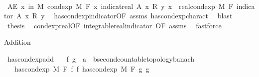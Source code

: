 \begin{isabellebody}
%
\isadelimproof
%
\endisadelimproof
%
\isatagproof
{}\isamarkupfalse%
\ {\isacharminus}{\kern0pt}\isanewline
\ \ \isamarkupfalse%
\ {\isachardoublequoteopen}AE\ x\ in\ M{\isachardot}{\kern0pt}\ cond{\isacharunderscore}{\kern0pt}exp\ M\ F\ {\isacharparenleft}{\kern0pt}{\isasymlambda}x{\isachardot}{\kern0pt}\ indicat{\isacharunderscore}{\kern0pt}real\ A\ x\ {\isacharasterisk}{\kern0pt}\isactrlsub R\ y{\isacharparenright}{\kern0pt}\ x\ {\isacharequal}{\kern0pt}\ real{\isacharunderscore}{\kern0pt}cond{\isacharunderscore}{\kern0pt}exp\ M\ F\ {\isacharparenleft}{\kern0pt}indicator\ A{\isacharparenright}{\kern0pt}\ x\ {\isacharasterisk}{\kern0pt}\isactrlsub R\ y{\isachardoublequoteclose}\ \isamarkupfalse%
\ has{\isacharunderscore}{\kern0pt}cond{\isacharunderscore}{\kern0pt}exp{\isacharunderscore}{\kern0pt}indicator{\isacharbrackleft}{\kern0pt}OF\ assms{\isacharbrackright}{\kern0pt}\ has{\isacharunderscore}{\kern0pt}cond{\isacharunderscore}{\kern0pt}exp{\isacharunderscore}{\kern0pt}charact\ \isamarkupfalse%
\ blast\isanewline
\ \ \isamarkupfalse%
\ {\isacharquery}{\kern0pt}thesis\ \isamarkupfalse%
\ cond{\isacharunderscore}{\kern0pt}exp{\isacharunderscore}{\kern0pt}real{\isacharbrackleft}{\kern0pt}OF\ integrable{\isacharunderscore}{\kern0pt}real{\isacharunderscore}{\kern0pt}indicator{\isacharcomma}{\kern0pt}\ OF\ assms{\isacharbrackright}{\kern0pt}\ \isamarkupfalse%
\ fastforce\isanewline
{}\isamarkupfalse%
%
\endisatagproof
{\isafoldproof}%
%
\isadelimproof
%
\endisadelimproof
%
\begin{isamarkuptext}%
Addition%
\end{isamarkuptext}\isamarkuptrue%
\isamarkupfalse%
\ has{\isacharunderscore}{\kern0pt}cond{\isacharunderscore}{\kern0pt}exp{\isacharunderscore}{\kern0pt}add{\isacharcolon}{\kern0pt}\isanewline
\ \ \ f\ g\ {\isacharcolon}{\kern0pt}{\isacharcolon}{\kern0pt}\ {\isachardoublequoteopen}{\isacharprime}{\kern0pt}a\ {\isasymRightarrow}\ {\isacharprime}{\kern0pt}b{\isacharcolon}{\kern0pt}{\isacharcolon}{\kern0pt}{\isacharbraceleft}{\kern0pt}second{\isacharunderscore}{\kern0pt}countable{\isacharunderscore}{\kern0pt}topology{\isacharcomma}{\kern0pt}banach{\isacharbraceright}{\kern0pt}{\isachardoublequoteclose}\isanewline
\ \ \ {\isachardoublequoteopen}has{\isacharunderscore}{\kern0pt}cond{\isacharunderscore}{\kern0pt}exp\ M\ F\ f\ f{\isacharprime}{\kern0pt}{\isachardoublequoteclose}\ {\isachardoublequoteopen}has{\isacharunderscore}{\kern0pt}cond{\isacharunderscore}{\kern0pt}exp\ M\ F\ g\ g{\isacharprime}{\kern0pt}{\isachardoublequoteclose}\isanewline

\end{isabellebody}
